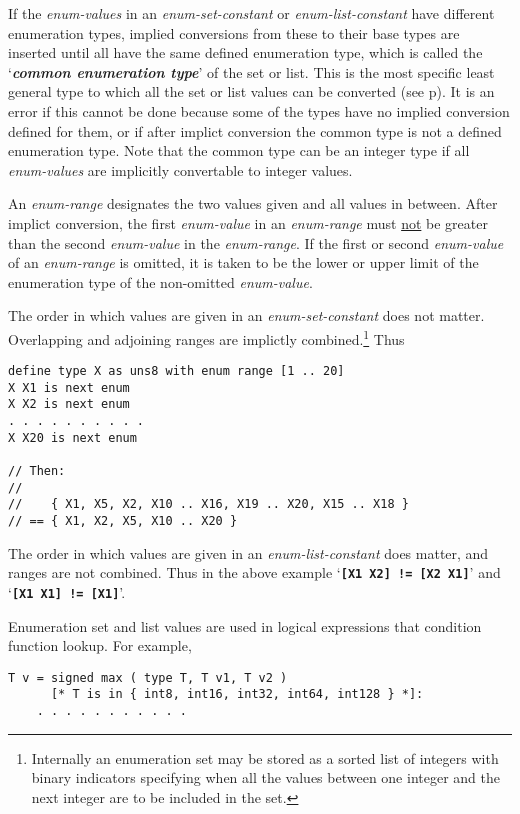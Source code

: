 \documentclass[12pt]{article}
\newcommand{\TT}[1]{{\tt \bfseries #1}}
\newcommand{\key}[1]{{\bf \em #1}\index{#1}}
\newcommand{\pagref}[1]{p\pageref{#1}}
\newenvironment{indpar}[1][0.3in]%
	{\begin{list}{}%
		     {\setlength{\itemsep}{0in}%
		      \setlength{\topsep}{0in}%
		      \setlength{\parsep}{1ex}%
		      \setlength{\labelwidth}{#1}%
		      \setlength{\leftmargin}{#1}%
		      \addtolength{\leftmargin}{\labelsep}}%
	 \item}%
	{\end{list}}
\begin{document}
If the {\em enum-values} in an {\em enum-set-constant} or
{\em enum-list-constant} have different
enumeration types, implied conversions from these to their base types
are inserted until all have the same defined enumeration type,
which is called the
`\key{common enumeration type}'\label{COMMON-ENUMERATION-TYPE}
of the set or list.
This is the most specific least general type to which all the set
or list
values can be converted (see \pagref{CONVERSION-RELATION}).
It is an error
if this cannot be done because some of the types have no implied
conversion defined for them, or if after implict conversion the
common type is not a defined enumeration type.
Note that the common type can be an integer type if all
{\em enum-values} are implicitly convertable to integer values.

An {\em enum-range} designates the two values given and all
values in between.
After implict conversion, the first {\em enum-value} in an {\em enum-range}
must \underline{not} be greater than the second {\em enum-value}
in the {\em enum-range}.  If the first or second {\em enum-value} of
an {\em enum-range} is omitted, it is taken to be the lower or upper
limit of the enumeration type of the non-omitted {\em enum-value}.

The order in which values are given in an {\em enum-set-constant}
does not matter.  Overlapping and adjoining ranges are implictly
combined.\footnote{Internally an enumeration set may be stored as a
sorted list of integers with binary indicators specifying when all
the values between one integer and the next integer are to be included
in the set.}
Thus
\begin{indpar}\begin{verbatim}
define type X as uns8 with enum range [1 .. 20]
X X1 is next enum
X X2 is next enum
. . . . . . . . . .
X X20 is next enum

// Then:
//
//    { X1, X5, X2, X10 .. X16, X19 .. X20, X15 .. X18 }
// == { X1, X2, X5, X10 .. X20 }
\end{verbatim}\end{indpar}

The order in which values are given in an {\em enum-list-constant}
does matter, and ranges are not combined.  Thus in the above
example `\TT{[X1 X2] != [X2 X1]}' and `\TT{[X1 X1] != [X1]}'.

Enumeration set and list values are used in logical expressions that
condition function lookup.  For example,
\begin{indpar}\begin{verbatim}
T v = signed max ( type T, T v1, T v2 )
      [* T is in { int8, int16, int32, int64, int128 } *]:
    . . . . . . . . . . .
\end{verbatim}\end{indpar}
\end{document}
